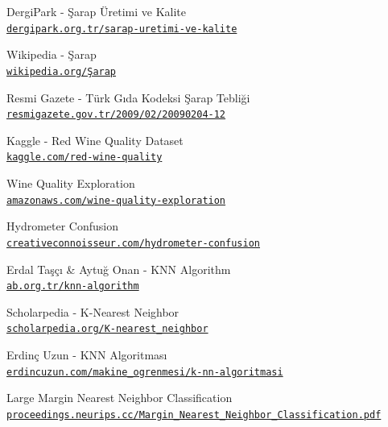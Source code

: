 \documentclass[conference]{IEEEtran}
\begin{document}
\newpage
\begin{thebibliography}{23}

DergiPark - Şarap Üretimi ve Kalite
\\\texttt{\href{https://dergipark.org.tr/tr/download/article-file/498270}{\nolinkurl{dergipark.org.tr/sarap-uretimi-ve-kalite}}}

Wikipedia - Şarap
\\\texttt{\href{https://tr.wikipedia.org/wiki/Şarap}{\nolinkurl{wikipedia.org/Şarap}}}

Resmi Gazete - Türk Gıda Kodeksi Şarap Tebliği
\\\texttt{\href{https://www.resmigazete.gov.tr/eskiler/2009/02/20090204-12.htm}{\nolinkurl{resmigazete.gov.tr/2009/02/20090204-12}}}

Kaggle - Red Wine Quality Dataset
\\\texttt{\href{https://www.kaggle.com/uciml/red-wine-quality-cortez-et-al-2009}{\nolinkurl{kaggle.com/red-wine-quality}}}

Wine Quality Exploration
\\\texttt{\href{http://rstudio-pubs-static.s3.amazonaws.com/80458_5000e31f84df449099a872ccf40747b7.html}{\nolinkurl{amazonaws.com/wine-quality-exploration}}}

Hydrometer Confusion
\\\texttt{\href{http://www.creativeconnoisseur.com/newsletter/files/497deafe6be1b2efc87df8ac6071e459-162.html}{\nolinkurl{creativeconnoisseur.com/hydrometer-confusion}}}

Erdal Taşçı \& Aytuğ Onan - KNN Algorithm
\\\texttt{\href{https://ab.org.tr/ab16/bildiri/102.pdf}{\nolinkurl{ab.org.tr/knn-algorithm}}}

Scholarpedia - K-Nearest Neighbor
\\\texttt{\href{http://scholarpedia.org/article/K-nearest_neighbor}{\nolinkurl{scholarpedia.org/K-nearest_neighbor}}}

Erdinç Uzun - KNN Algoritması
\\\texttt{\href{https://erdincuzun.com/makine_ogrenmesi/k-nn-algoritmasi/}{\nolinkurl{erdincuzun.com/makine_ogrenmesi/k-nn-algoritmasi}}}

Large Margin Nearest Neighbor Classification
\\\texttt{\href{https://proceedings.neurips.cc/paper/2005/file/a7f592cef8b130a6967a90617db5681b-Paper.pdf}{\nolinkurl{proceedings.neurips.cc/Margin_Nearest_Neighbor_Classification.pdf}}}


\end{thebibliography}
\end{document}
